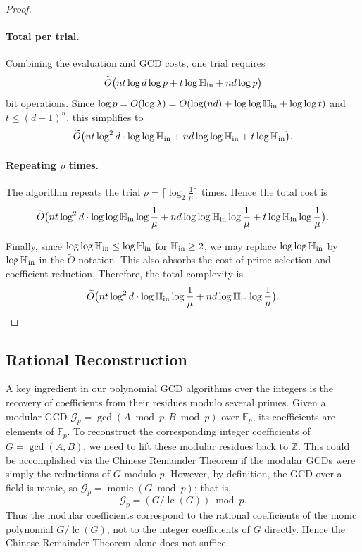 \documentclass{article}
\numberwithin{equation}{section}
\begin{document}
\begin{proof}
\paragraph{Total per trial.}
Combining the evaluation and GCD costs, one trial requires
\[
\widetilde{O}\bigl( n t \log d \log p + t\log \mathbb{H}_{\rm in} + n d \log p \bigr)
\]
bit operations. Since $\log p = O(\log \lambda) = O(\log(nd) + \log\log \mathbb{H}_{\rm in} + \log\log t)$ and $t \le (d+1)^n$, this simplifies to
\[
\widetilde{O}\bigl( n t \log^2 d \cdot \log\log \mathbb{H}_{\rm in} + n d \log\log \mathbb{H}_{\rm in} +t\log\mathbb{H}_{\rm in}\bigr).
\]

\paragraph{Repeating $\rho$ times.}
The algorithm repeats the trial $\rho = \lceil \log_2\frac{1}{\mu} \rceil$ times. Hence the total cost is
\[
\widetilde{O}\bigl( n t \log^2 d \cdot \log\log \mathbb{H}_{\rm in} \log\frac{1}{\mu} + n d \log\log \mathbb{H}_{\rm in} \log\frac{1}{\mu} +t\log\mathbb{H}_{\rm in}\log\frac{1}{\mu}\bigr).
\]

Finally, since $\log\log \mathbb{H}_{\rm in} \le \log \mathbb{H}_{\rm in}$ for $\mathbb{H}_{\rm in} \ge 2$, we may replace $\log\log \mathbb{H}_{\rm in}$ by $\log \mathbb{H}_{\rm in}$ in the $\widetilde{O}$ notation. This also absorbs the cost of prime selection and coefficient reduction. Therefore, the total complexity is
\[
\widetilde{O}\bigl( n t \log^2 d \cdot \log \mathbb{H}_{\rm in} \log\frac{1}{\mu} + n d \log \mathbb{H}_{\rm in} \log\frac{1}{\mu} \bigr).
\]
\end{proof}


\subsection{Rational Reconstruction}

A key ingredient in our polynomial GCD algorithms over the integers is the recovery of coefficients from their residues modulo several primes. Given a modular GCD $\mathcal{G}_p = \gcd(A \bmod p, B \bmod p)$ over $\mathbb{F}_p$, its coefficients are elements of $\mathbb{F}_p$. To reconstruct the corresponding integer coefficients of $G = \gcd(A,B)$, we need to lift these modular residues back to $\mathbb{Z}$. This could be accomplished via the Chinese Remainder Theorem if the modular GCDs were simply the reductions of $G$ modulo $p$. However, by definition, the GCD over a field is monic, so $\mathcal{G}_p = \operatorname{monic}(G \bmod p)$; that is,
\[
\mathcal{G}_p = (G / \operatorname{lc}(G)) \bmod p.
\]
Thus the modular coefficients correspond to the rational coefficients of the monic polynomial $G / \operatorname{lc}(G)$, not to the integer coefficients of $G$ directly. Hence the Chinese Remainder Theorem alone does not suffice.
\end{document}
